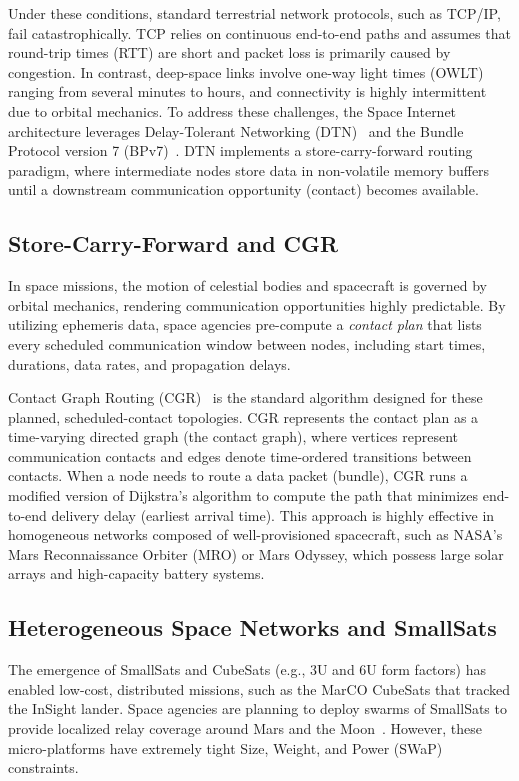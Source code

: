 \documentclass[a4paper,fleqn]{cas-dc}
\begin{document}
Under these conditions, standard terrestrial network protocols, such as TCP/IP, fail catastrophically. TCP relies on continuous end-to-end paths and assumes that round-trip times (RTT) are short and packet loss is primarily caused by congestion. In contrast, deep-space links involve one-way light times (OWLT) ranging from several minutes to hours, and connectivity is highly intermittent due to orbital mechanics. To address these challenges, the Space Internet architecture leverages Delay-Tolerant Networking (DTN)~\cite{fall2003dtn,cerf2007dtn} and the Bundle Protocol version 7 (BPv7)~\cite{rfc9171}. DTN implements a store-carry-forward routing paradigm, where intermediate nodes store data in non-volatile memory buffers until a downstream communication opportunity (contact) becomes available.

\subsection{Store-Carry-Forward and CGR}
In space missions, the motion of celestial bodies and spacecraft is governed by orbital mechanics, rendering communication opportunities highly predictable. By utilizing ephemeris data, space agencies pre-compute a \emph{contact plan} that lists every scheduled communication window between nodes, including start times, durations, data rates, and propagation delays. 

Contact Graph Routing (CGR)~\cite{burleigh2010cgr} is the standard algorithm designed for these planned, scheduled-contact topologies. CGR represents the contact plan as a time-varying directed graph (the contact graph), where vertices represent communication contacts and edges denote time-ordered transitions between contacts. When a node needs to route a data packet (bundle), CGR runs a modified version of Dijkstra's algorithm to compute the path that minimizes end-to-end delivery delay (earliest arrival time). This approach is highly effective in homogeneous networks composed of well-provisioned spacecraft, such as NASA's Mars Reconnaissance Orbiter (MRO) or Mars Odyssey, which possess large solar arrays and high-capacity battery systems.

\subsection{Heterogeneous Space Networks and SmallSats}
The emergence of SmallSats and CubeSats (e.g., 3U and 6U form factors) has enabled low-cost, distributed missions, such as the MarCO CubeSats that tracked the InSight lander. Space agencies are planning to deploy swarms of SmallSats to provide localized relay coverage around Mars and the Moon~\cite{nasa2022artemis,yang2016smallsat}. However, these micro-platforms have extremely tight Size, Weight, and Power (SWaP) constraints. 
\end{document}
